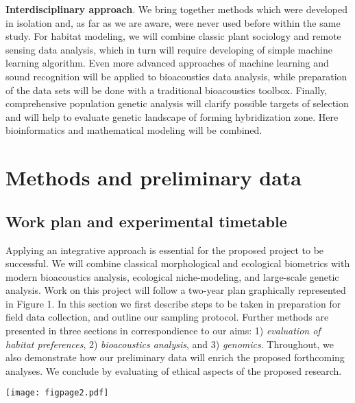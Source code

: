 \documentclass[11pt,a4paper]{article}
\begin{document}
\textbf{Interdisciplinary approach}. We bring together methods which were developed in isolation and, as far as we are aware, were never used before within the same study. For habitat modeling, we will combine classic plant sociology and remote sensing data analysis, which in turn will require developing of simple machine learning algorithm. Even more advanced approaches of machine learning and sound recognition will be applied to bioacoustics data analysis, while preparation of the data sets will be done with a traditional bioacoustics toolbox. Finally, comprehensive population genetic analysis will clarify possible targets of selection and will help to evaluate genetic landscape of forming hybridization zone. Here bioinformatics and mathematical modeling will be combined.


\section{Methods and preliminary data}
\subsection{Work plan and experimental timetable}
Applying an integrative approach is essential for the proposed project to be successful. We will combine classical morphological and ecological biometrics with modern bioacoustics analysis, ecological niche-modeling, and large-scale genetic analysis.
Work on this project will follow a two-year plan graphically represented in Figure 1. In this section we first describe steps to be taken in preparation for field data collection, and outline our sampling protocol. Further methods are presented in three sections in correspondience to our aims: 1) \textit{evaluation of habitat preferences}, 2) \textit{bioacoustics analysis}, and 3) \textit{genomics}. Throughout, we also demonstrate how our preliminary data will enrich the proposed forthcoming analyses. We conclude by evaluating of ethical aspects of the proposed research. 

\begin{landscape}
\thispagestyle{empty}
\texttt{[image: figpage2.pdf]}
\label{Fig:page}
\end{landscape}
\restoregeometry
\end{document}
